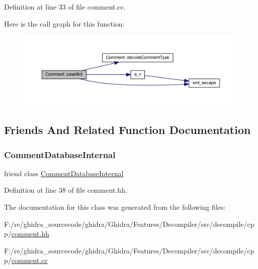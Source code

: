 Definition at line 33 of file comment.\+cc.

Here is the call graph for this function\+:
\nopagebreak
\begin{figure}[H]
\begin{center}
\leavevmode
\includegraphics[width=350pt]{class_comment_af5f3045a6d056b6c00af6fc35c741b0a_cgraph}
\end{center}
\end{figure}


\subsection{Friends And Related Function Documentation}
\mbox{\label{class_comment_a075d4f05616865ad828b69262fceb48a}} 
\subsubsection{\texorpdfstring{CommentDatabaseInternal}{CommentDatabaseInternal}}
{\footnotesize\ttfamily friend class \mbox{\hyperlink{class_comment_database_internal}{Comment\+Database\+Internal}}\hspace{0.3cm}{\ttfamily [friend]}}



Definition at line 38 of file comment.\+hh.



The documentation for this class was generated from the following files\+:\begin{DoxyCompactItemize}
\item 
F\+:/re/ghidra\+\_\+sourcecode/ghidra/\+Ghidra/\+Features/\+Decompiler/src/decompile/cpp/\mbox{\hyperlink{comment_8hh}{comment.\+hh}}\item 
F\+:/re/ghidra\+\_\+sourcecode/ghidra/\+Ghidra/\+Features/\+Decompiler/src/decompile/cpp/\mbox{\hyperlink{comment_8cc}{comment.\+cc}}\end{DoxyCompactItemize}
